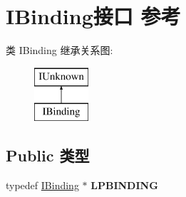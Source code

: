 \hypertarget{interface_i_binding}{}\section{I\+Binding接口 参考}
\label{interface_i_binding}
类 I\+Binding 继承关系图\+:\begin{figure}[H]
\begin{center}
\leavevmode
\includegraphics[height=2.000000cm]{interface_i_binding}
\end{center}
\end{figure}
\subsection*{Public 类型}
\begin{DoxyCompactItemize}
\item 
\mbox{\label{interface_i_binding_a02fe151c593b45435fe368eed540ffc6}} 
typedef \hyperlink{interface_i_binding}{I\+Binding} $\ast$ {\bfseries L\+P\+B\+I\+N\+D\+I\+NG}
\end{DoxyCompactItemize}

